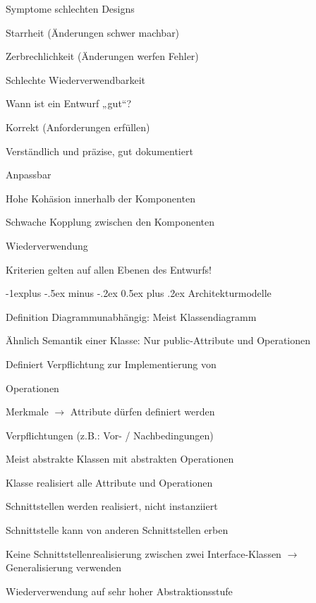 \documentclass[a4paper]{article}
\makeatletter
\renewcommand{\subsection}{\@startsection{subsection}{2}{0mm}%
                                {-1explus -.5ex minus -.2ex}%
                                {0.5ex plus .2ex}%
                                {\normalfont\normalsize\bfseries}}
\makeatother
\begin{document}
\begin{multicols}{3}
  Symptome schlechten Designs
  \begin{itemize*}
    \item Starrheit (Änderungen schwer machbar)
    \item Zerbrechlichkeit (Änderungen werfen Fehler)
    \item Schlechte Wiederverwendbarkeit
  \end{itemize*}

  Wann ist ein Entwurf „gut“?
  \begin{itemize*}
    \item Korrekt (Anforderungen erfüllen)
    \item Verständlich und präzise, gut dokumentiert
    \item Anpassbar
    \item Hohe Kohäsion innerhalb der Komponenten
    \item Schwache Kopplung zwischen den Komponenten
    \item Wiederverwendung
    \item Kriterien gelten auf allen Ebenen des Entwurfs!
  \end{itemize*}

  \subsection{Architekturmodelle}
  \begin{itemize*}
    \item Definition Diagrammunabhängig: Meist Klassendiagramm
    \item Ähnlich Semantik einer Klasse: Nur public-Attribute und Operationen
    \item Definiert Verpflichtung zur Implementierung von
    \begin{itemize*}
      \item Operationen
      \item Merkmale $\rightarrow$ Attribute dürfen definiert werden
      \item Verpflichtungen (z.B.: Vor- / Nachbedingungen)
    \end{itemize*}
    \item Meist abstrakte Klassen mit abstrakten Operationen
    \item Klasse realisiert alle Attribute und Operationen
    \item Schnittstellen werden realisiert, nicht instanziiert
    \item Schnittstelle kann von anderen Schnittstellen erben
    \item Keine Schnittstellenrealisierung zwischen zwei Interface-Klassen $\rightarrow$ Generalisierung verwenden
    \item Wiederverwendung auf sehr hoher Abstraktionsstufe
  \end{itemize*}


\end{multicols}
\end{document}
